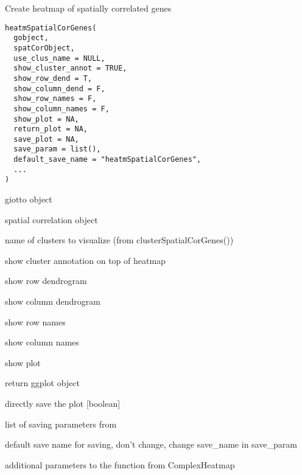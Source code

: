 \documentclass[a4paper]{book}
\begin{document}
%
\begin{Description}\relax
Create heatmap of spatially correlated genes
\end{Description}
%
\begin{Usage}
\begin{verbatim}
heatmSpatialCorGenes(
  gobject,
  spatCorObject,
  use_clus_name = NULL,
  show_cluster_annot = TRUE,
  show_row_dend = T,
  show_column_dend = F,
  show_row_names = F,
  show_column_names = F,
  show_plot = NA,
  return_plot = NA,
  save_plot = NA,
  save_param = list(),
  default_save_name = "heatmSpatialCorGenes",
  ...
)
\end{verbatim}
\end{Usage}
%
\begin{Arguments}
\begin{ldescription}
\item[\code{gobject}] giotto object

\item[\code{spatCorObject}] spatial correlation object

\item[\code{use\_clus\_name}] name of clusters to visualize (from clusterSpatialCorGenes())

\item[\code{show\_cluster\_annot}] show cluster annotation on top of heatmap

\item[\code{show\_row\_dend}] show row dendrogram

\item[\code{show\_column\_dend}] show column dendrogram

\item[\code{show\_row\_names}] show row names

\item[\code{show\_column\_names}] show column names

\item[\code{show\_plot}] show plot

\item[\code{return\_plot}] return ggplot object

\item[\code{save\_plot}] directly save the plot [boolean]

\item[\code{save\_param}] list of saving parameters from 

\item[\code{default\_save\_name}] default save name for saving, don't change, change save\_name in save\_param

\item[\code{...}] additional parameters to the  function from ComplexHeatmap
\end{ldescription}
\end{Arguments}
\end{document}
